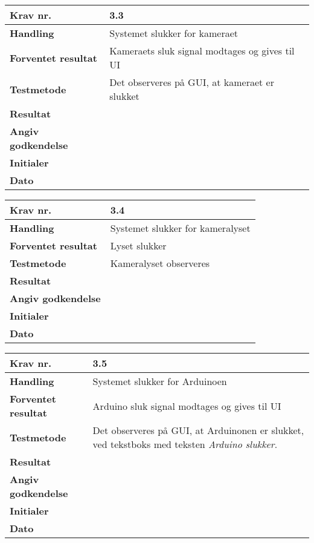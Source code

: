 	\begin{center}
		\begin{longtable}{ | m{4cm}| m{8.5cm}|} 
			\hline
			\textbf{Krav nr.} & 3.3  \\ 
			\hline
			\textbf{Handling} & Systemet slukker for kameraet  \\
			\hline
			\textbf{Forventet resultat} & Kameraets sluk signal modtages og gives til UI \\
			\hline
			\textbf{Testmetode}  & Det observeres på GUI, at kameraet er slukket  \\
			\hline
			\textbf{Resultat}  &    \\
			\hline
			\textbf{Angiv godkendelse} &     \\
			\hline
			\textbf{Initialer} &     \\
			\hline
			\textbf{Dato} &    \\
			\hline
		\end{longtable}
	\end{center}			
		
\newpage		
			
	\begin{center}
		\begin{longtable}{ | m{4cm}| m{8.5cm}|} 
			\hline
			\textbf{Krav nr.} & 3.4  \\ 
			\hline
			\textbf{Handling} & Systemet slukker for kameralyset   \\
			\hline
			\textbf{Forventet resultat} & Lyset slukker \\
			\hline
			\textbf{Testmetode}  & Kameralyset observeres  \\
			\hline
			\textbf{Resultat}  &    \\
			\hline
			\textbf{Angiv godkendelse} &     \\
			\hline
			\textbf{Initialer} &     \\
			\hline
			\textbf{Dato} &    \\
			\hline
		\end{longtable}
	\end{center}
			
	\begin{center}
		\begin{longtable}{ | m{4cm}| m{8.5cm}|} 
			\hline
			\textbf{Krav nr.} & 3.5  \\ 
			\hline
			\textbf{Handling} & Systemet slukker for Arduinoen   \\
			\hline
			\textbf{Forventet resultat} & Arduino sluk signal modtages og gives til UI \\
			\hline
			\textbf{Testmetode}  & Det observeres på GUI, at Arduinonen er slukket, ved tekstboks med teksten \textit{Arduino slukker}.  \\
			\hline
			\textbf{Resultat}  &    \\
			\hline
			\textbf{Angiv godkendelse} &     \\
			\hline
			\textbf{Initialer} &     \\
			\hline
			\textbf{Dato} &    \\
			\hline
		\end{longtable}
	\end{center}
					
